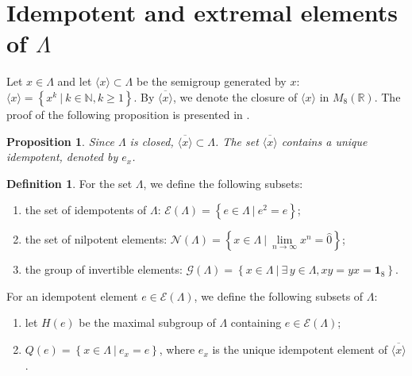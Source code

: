 \documentclass[12pt]{article}
\theoremstyle{plain}
\newtheorem{proposition}{Proposition}
\theoremstyle{definition}
\newtheorem{definition}{Definition}
\theoremstyle{remark}
\numberwithin{equation}{section}
\begin{document}

\section{Idempotent and extremal elements of $\Lambda$}
\label{sec:main}

Let $x \in \Lambda$ and let 
$\langle x \rangle \subset \Lambda$ be the semigroup generated by $x$:
$\langle x \rangle = \left \{ x^{k} \: | \: k \in \mathbb{N}, k \geq 1 \right \}$.
By $\overline{\langle x \rangle}$,
we denote the closure of $\langle x \rangle$ in $M_{8}(\mathbb{R})$.
The proof of the following proposition is presented in
    \cite[Lemma 3]{schwarz1955hausdorff}.

\begin{proposition}
    \label{prop:UniqeClusterPoint}
    Since $\Lambda$ is closed, $\overline{\langle x \rangle} \subset \Lambda$.
    The set $\overline{\langle x \rangle}$ contains a unique idempotent,
        denoted by $e_{x}$.
\end{proposition}

\begin{definition}
    For the set $\Lambda$, we define the following subsets:
    \begin{enumerate}
       \item the set of idempotents of $\Lambda$:
            $\mathcal{E}(\Lambda) = \left \{ e \in \Lambda \: |  \: e^{2} = e \right \}$;
       \item the set of nilpotent elements:
            $\mathcal{N}(\Lambda) = \left \{ x \in \Lambda \: |  \: \lim \limits_{n \rightarrow \infty} x^{n} = \hat{0} \right \}$;     
       \item the group of invertible elements:
            $\mathcal{G}(\Lambda) = \left \{ x \in \Lambda \: |  \: \exists \, y \in \Lambda, xy = yx = \mathbf{1}_{8} \right \}$.       
    \end{enumerate}
   For an idempotent element $e \in \mathcal{E}(\Lambda)$,
   we define the following subsets of $\Lambda$:
   \begin{enumerate}
        \item let $H(e)$ be the maximal subgroup of $\Lambda$ 
            containing $e \in \mathcal{E}(\Lambda)$;
        \item $Q(e) = \left \{ x \in \Lambda \: | \: e_{x} = e \right \}$,
        where $e_{x}$ is the unique idempotent element of $\overline{\langle x \rangle}$.
   \end{enumerate}
\end{definition}
\end{document}
